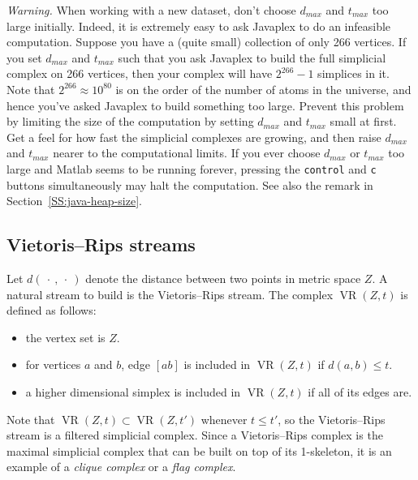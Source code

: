 \documentclass[amscd, amssymb, verbatim]{amsart}[12pt]
\theoremstyle{remark}
\theoremstyle{remark}
\theoremstyle{remark}
\DeclareMathOperator{\VR}{VR}
\begin{document}
{\em Warning.} When working with a new dataset, don't choose $d_{max}$ and $t_{max}$ too large initially. Indeed, it is extremely easy to ask Javaplex to do an infeasible computation. Suppose you have a (quite small) collection of only 266 vertices. If you set $d_{max}$ and $t_{max}$ such that you ask Javaplex to build the full simplicial complex on 266 vertices, then your complex will have $2^{266}-1$ simplices in it. Note that $2^{266}\approx 10^{80}$ is on the order of the number of atoms in the universe, and hence you've asked Javaplex to build something too large. Prevent this problem by limiting the size of the computation by setting $d_{max}$ and $t_{max}$ small at first. Get a feel for how fast the simplicial complexes are growing, and then raise $d_{max}$ and $t_{max}$ nearer to the computational limits. If you ever choose $d_{max}$ or $t_{max}$ too large and Matlab seems to be running forever, pressing the \texttt{control} and \texttt{c} buttons simultaneously may halt the computation. See also the remark in Section~\ref{SS:java-heap-size}.



\subsection{Vietoris--Rips streams}\label{SS:VietorisRips}
Let  $d(\ \cdot\ ,\ \cdot \ )$ denote the distance between two points in metric space $Z$. A natural stream to build is the Vietoris--Rips stream. The complex $\VR(Z,t)$ is defined as follows: 
\begin{itemize}
\item{the vertex set is $Z$.}
\item{for vertices $a$ and $b$, edge $[ab]$ is included in $\VR(Z,t)$ if $d(a,b) \leq t$.}
\item{a higher dimensional simplex is included in $\VR(Z,t)$ if all of its edges are.}
\end{itemize}
Note that $\VR(Z,t) \subset \VR(Z,t')$ whenever $t\leq t'$, so the Vietoris--Rips stream is a filtered simplicial complex. Since a Vietoris--Rips complex is the maximal simplicial complex that can be built on top of its 1-skeleton, it is an example of a {\em clique complex} or a {\em flag complex}. 
\end{document}
